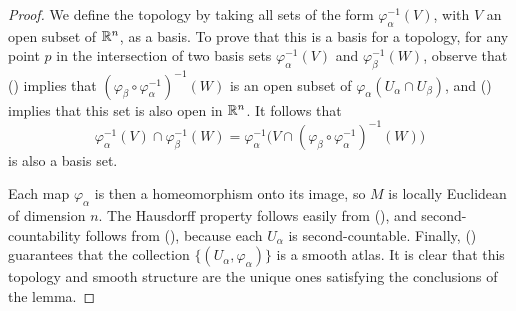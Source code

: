 \begin{proof}
We define the topology by taking all sets of the form $\varphi_\alpha^{-1}(V)$, with $V$ an open subset of $\mathbb{R}^n$, as a basis. To prove that this is a basis for a topology, for any point $p$ in the intersection of two basis sets $\varphi_\alpha^{-1}(V)$ and $\varphi_\beta^{-1}(W)$, observe that () implies that $(\varphi_\beta\circ\varphi_\alpha^{-1})^{-1}(W)$ is an open subset of $\varphi_\alpha(U_\alpha\cap U_\beta)$, and () implies that this set is also open in $\mathbb{R}^n$. It follows that
\[\varphi_\alpha^{-1}(V)\cap\varphi_\beta^{-1}(W)=\varphi_\alpha^{-1}\big(V\cap(\varphi_\beta\circ\varphi_\alpha^{-1})^{-1}(W)\big)\]
is also a basis set.\par
Each map $\varphi_\alpha$ is then a homeomorphism onto its image, so $M$ is locally Euclidean of dimension $n$. The Hausdorff property follows easily from (), and second-countability follows from (), because each $U_\alpha$ is second-countable. Finally, () guarantees that the collection $\{(U_\alpha,\varphi_\alpha)\}$ is a smooth atlas. It is clear that this topology and smooth structure are the unique ones satisfying the conclusions of the lemma.
\end{proof}
